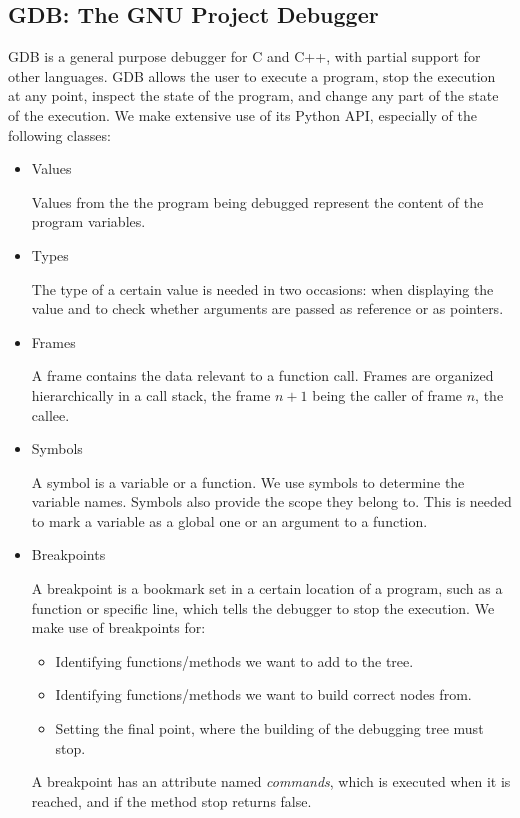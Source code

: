 \subsection{GDB: The GNU Project Debugger}
GDB \cite{gdb} is a general purpose debugger for C and C++, with partial support for other languages. GDB allows the user to execute a program, stop the execution at any point, inspect the state of the program, and change any part of the state of the execution.
%
We make extensive use of its Python API, especially of the following classes:

\begin{itemize}

\item Values

Values from the the program being debugged represent the content of the program variables.

\item Types

The type of a certain value is needed in two occasions: when displaying the value and to check whether arguments are passed as reference or as pointers.
\item Frames

A frame contains the data relevant to a function call.
Frames are organized hierarchically in a call stack, the frame \(n+1\) being the caller of frame \(n\), the callee.
\item Symbols

A symbol is a variable or a function. We use symbols to determine the variable names. Symbols also provide the scope they belong to. This is needed to mark a variable as a global one or an argument to a function.
\item Breakpoints

A breakpoint is a bookmark set in a certain location of a program, such as a function or specific line, which tells the debugger to stop the execution.
We make use of breakpoints for:
\begin{itemize}
    \item Identifying functions/methods we want to add to the tree.
    \item Identifying functions/methods we want to build correct nodes from.
    \item Setting the final point, where the building of the debugging tree must stop.
\end{itemize}
A breakpoint has an attribute named \emph{commands}, which is executed when it is reached, and if the method stop returns false.


\end{itemize}
